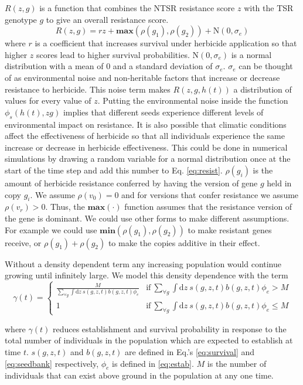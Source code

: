 \documentclass[12pt, a4paper]{article}
\begin{document}
$R(z, g)$ is a function that combines the NTSR resistance score $z$ with the TSR genotype $g$ to give an overall resistance score. 
\begin{equation}\label{eq:resist}
	R(z, g) = rz + \textbf{max}(\rho(g_1), \rho(g_2)) + \text{N}(0, \sigma_e)
\end{equation}
where $r$ is a coefficient that increases survival under herbicide application so that higher $z$ scores lead to higher survival probabilities. $\text{N}(0, \sigma_e)$ is a normal distribution with a mean of 0 and a standard deviation of $\sigma_e$. $\sigma_e$ can be thought of as environmental noise and non-heritable factors that increase or decrease resistance to herbicide. This noise term makes $R(z, g, h(t))$ a distribution of values for every value of $z$. Putting the environmental noise inside the function $\phi_s(h(t), z g)$ implies that different seeds experience different levels of environmental impact on resistance. It is also possible that climatic conditions affect the effectiveness of herbicide so that all individuals experience the same increase or decrease in herbicide effectiveness. This could be done in numerical simulations by drawing a random variable for a normal distribution once at the start of the time step and add this number to Eq. \ref{eq:resist}. $\rho(g_i)$ is the amount of herbicide resistance conferred by having the version of gene $g$ held in copy $g_i$. We assume $\rho(v_0) = 0$ and for versions that confer resistance we assume $\rho(v_r) > 0$. Thus, the $\textbf{max}(\cdot)$ function assumes that the resistance version of the gene is dominant. We could use other forms to make different assumptions. For example we could use $\textbf{min}(\rho(g_1), \rho(g_2))$ to make resistant genes receive, or $\rho(g_1) + \rho(g_2)$ to make the copies additive in their effect. 

Without a density dependent term any increasing population would continue growing until infinitely large. We model this density dependence with the term 
\begin{equation}\label{eq:density_dependence}
	\gamma(t) =
		\begin{cases}
			\frac{M}{\sum_{\forall g}\int \text{d}z~ s(g, z, t)b(g, z, t)\phi_e} &\text{if}~ \sum_{\forall g}\int \text{d}z~ s(g, z, t)b(g, z, t)\phi_e > M \\
			1 &\text{if}~ \sum_{\forall g}\int \text{d}z~ s(g, z, t)b(g, z, t)\phi_e \leq M  
		\end{cases}
\end{equation}

where $\gamma(t)$ reduces establishment and survival probability in response to the total number of individuals in the population which are expected to establish at time $t$. $s(g, z, t)$ and $b(g, z, t)$ are defined in Eq.'s \ref{eq:survival} and \ref{eq:seedbank} respectively, $\phi_e$ is defined in \ref{eq:estab}. $M$ is the number of individuals that can exist above ground in the population at any one time. 

 

\end{document}

